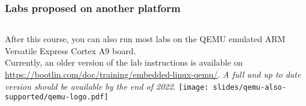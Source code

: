 \begin{frame}
\frametitle{Labs proposed on another platform}
  \begin{columns}
    After this course, you can also run most labs on the QEMU emulated
    ARM Versatile Express Cortex A9 board.\\
    \vspace{1em}
    Currently, an older version of the lab instructions is available on
    \url{https://bootlin.com/doc/training/embedded-linux-qemu/}. {\em A full
    and up to date version should be available by the end of 2022}.
    \texttt{[image: slides/qemu-also-supported/qemu-logo.pdf]}
  \end{columns}
  \vspace{1cm}
\end{frame}
